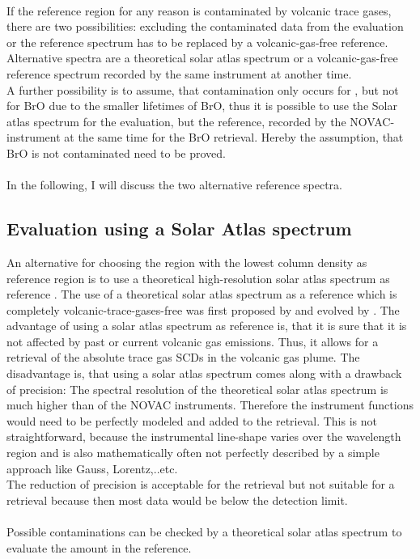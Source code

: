 \\
If the reference region for any reason is
contaminated by volcanic trace gases, there are two possibilities: excluding the contaminated data from the evaluation or the reference spectrum has to be
replaced by a volcanic-gas-free reference. Alternative spectra are a
theoretical solar atlas spectrum or a volcanic-gas-free reference
spectrum recorded by the same instrument at another time.\\
A further possibility is to assume, that contamination only occurs for , but not for BrO due to the smaller lifetimes of BrO, thus it is possible to use the Solar atlas spectrum for the  evaluation, but the reference, recorded by the NOVAC-instrument at the same time for the BrO retrieval. Hereby the assumption, that BrO is not contaminated need to be proved. \\
%
\\
%
In the following, I will discuss the two alternative reference spectra.
%
\subsection*{Evaluation using a Solar Atlas spectrum \label{kuruz}}
An alternative for choosing the region with the lowest column density as reference region is to use a theoretical high-resolution solar atlas spectrum as reference \citep{chance2010improved}.
The use of a theoretical solar atlas spectrum as a reference which is completely volcanic-trace-gases-free was first proposed by \cite{salerno2009novel} and evolved by \citep{lubcke2014bro}.
The advantage of using a solar atlas spectrum as reference is, that it is sure that it is not affected by past or current volcanic gas emissions. Thus, it allows for a retrieval of the absolute trace gas SCDs in the volcanic gas plume. The disadvantage is, that using a solar atlas spectrum comes along with a drawback of precision: The spectral resolution of the theoretical solar atlas spectrum is much  higher than of the NOVAC instruments. Therefore the instrument functions would need to be perfectly modeled and added to the retrieval. This is not straightforward, because the instrumental line-shape varies over the wavelength region and is also mathematically often not perfectly described by a simple approach like Gauss, Lorentz,..etc.\\ 
The reduction of precision is acceptable for the
 retrieval but not suitable for a  retrieval because then most data would be below the detection limit.\\
%
\\
%
Possible contaminations can be checked
by a theoretical solar atlas spectrum to evaluate the  amount in the reference.\\

